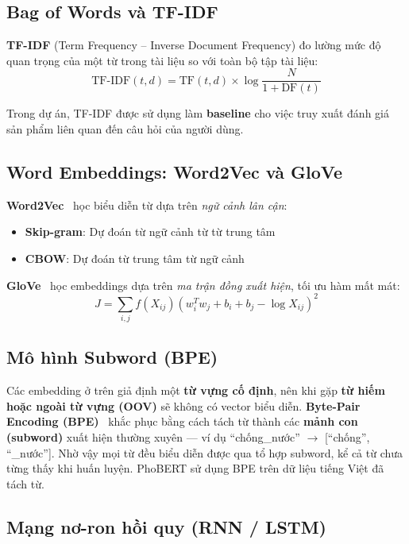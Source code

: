 \documentclass[12pt,a4paper]{article}
\begin{document}
\subsection{Bag of Words và TF-IDF}

\textbf{TF-IDF} (Term Frequency -- Inverse Document Frequency) đo lường mức độ quan trọng của một từ trong tài liệu so với toàn bộ tập tài liệu:
\[
  \text{TF-IDF}(t, d) = \text{TF}(t, d) \times \log\frac{N}{1 + \text{DF}(t)}
\]

Trong dự án, TF-IDF được sử dụng làm \textbf{baseline} cho việc truy xuất đánh giá sản phẩm liên quan đến câu hỏi của người dùng.

\subsection{Word Embeddings: Word2Vec và GloVe}

\textbf{Word2Vec}~\cite{mikolov2013} học biểu diễn từ dựa trên \textit{ngữ cảnh lân cận}:
\begin{itemize}
  \item \textbf{Skip-gram}: Dự đoán từ ngữ cảnh từ từ trung tâm
  \item \textbf{CBOW}: Dự đoán từ trung tâm từ ngữ cảnh
\end{itemize}

\textbf{GloVe}~\cite{pennington2014} học embeddings dựa trên \textit{ma trận đồng xuất hiện}, tối ưu hàm mất mát:
\[
  J = \sum_{i,j} f(X_{ij}) \left( w_i^T w_j + b_i + b_j - \log X_{ij} \right)^2
\]

\subsection{Mô hình Subword (BPE)}

Các embedding ở trên giả định một \textbf{từ vựng cố định}, nên khi gặp \textbf{từ hiếm hoặc ngoài từ vựng (OOV)} sẽ không có vector biểu diễn. \textbf{Byte-Pair Encoding (BPE)}~\cite{sennrich2016bpe} khắc phục bằng cách tách từ thành các \textbf{mảnh con (subword)} xuất hiện thường xuyên --- ví dụ ``chống\_nước'' $\to$ [``chống'', ``\_nước'']. Nhờ vậy mọi từ đều biểu diễn được qua tổ hợp subword, kể cả từ chưa từng thấy khi huấn luyện. PhoBERT sử dụng BPE trên dữ liệu tiếng Việt đã tách từ.

\subsection{Mạng nơ-ron hồi quy (RNN / LSTM)}
\end{document}
